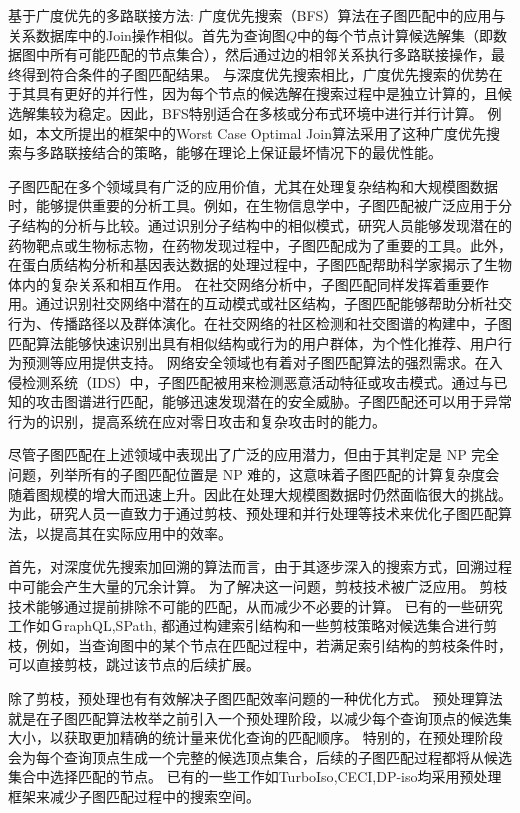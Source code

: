 基于广度优先的多路联接方法: 广度优先搜索（BFS）算法在子图匹配中的应用与关系数据库中的Join操作相似。首先为查询图$Q$中的每个节点计算候选解集（即数据图中所有可能匹配的节点集合），然后通过边的相邻关系执行多路联接操作，最终得到符合条件的子图匹配结果。
与深度优先搜索相比，广度优先搜索的优势在于其具有更好的并行性，因为每个节点的候选解在搜索过程中是独立计算的，且候选解集较为稳定。因此，BFS特别适合在多核或分布式环境中进行并行计算。
例如，本文所提出的框架中的Worst Case Optimal Join算法\cite{sm-bfs-DBLP:conf/focs/AtseriasGM08}采用了这种广度优先搜索与多路联接结合的策略，能够在理论上保证最坏情况下的最优性能。

子图匹配在多个领域具有广泛的应用价值，尤其在处理复杂结构和大规模图数据时，能够提供重要的分析工具。例如，在生物信息学中，子图匹配被广泛应用于分子结构的分析与比较。通过识别分子结构中的相似模式，研究人员能够发现潜在的药物靶点或生物标志物，在药物发现过程中，子图匹配成为了重要的工具。此外，在蛋白质结构分析和基因表达数据的处理过程中，子图匹配帮助科学家揭示了生物体内的复杂关系和相互作用。
在社交网络分析中，子图匹配同样发挥着重要作用。通过识别社交网络中潜在的互动模式或社区结构，子图匹配能够帮助分析社交行为、传播路径以及群体演化。在社交网络的社区检测和社交图谱的构建中，子图匹配算法能够快速识别出具有相似结构或行为的用户群体，为个性化推荐、用户行为预测等应用提供支持。
网络安全领域也有着对子图匹配算法的强烈需求。在入侵检测系统（IDS）中，子图匹配被用来检测恶意活动特征或攻击模式。通过与已知的攻击图谱进行匹配，能够迅速发现潜在的安全威胁。子图匹配还可以用于异常行为的识别，提高系统在应对零日攻击和复杂攻击时的能力。

尽管子图匹配在上述领域中表现出了广泛的应用潜力，但由于其判定是 NP 完全问题，列举所有的子图匹配位置是 NP 难的，这意味着子图匹配的计算复杂度会随着图规模的增大而迅速上升。因此在处理大规模图数据时仍然面临很大的挑战。
为此，研究人员一直致力于通过剪枝、预处理和并行处理等技术来优化子图匹配算法，以提高其在实际应用中的效率。

首先，对深度优先搜索加回溯的算法而言，由于其逐步深入的搜索方式，回溯过程中可能会产生大量的冗余计算。
为了解决这一问题，剪枝技术被广泛应用。
剪枝技术能够通过提前排除不可能的匹配，从而减少不必要的计算。
已有的一些研究工作如ＧraphQL\cite{sm-GraphQL-DBLP:series/ads/HeS10},SPath\cite{sm-spath-DBLP:journals/pvldb/ZhaoH10},
都通过构建索引结构和一些剪枝策略对候选集合进行剪枝，例如，当查询图中的某个节点在匹配过程中，若满足索引结构的剪枝条件时，可以直接剪枝，跳过该节点的后续扩展。

除了剪枝，预处理也有有效解决子图匹配效率问题的一种优化方式。 
预处理算法就是在子图匹配算法枚举之前引入一个预处理阶段，以减少每个查询顶点的候选集大小，以获取更加精确的统计量来优化查询的匹配顺序。
特别的，在预处理阶段会为每个查询顶点生成一个完整的候选顶点集合，后续的子图匹配过程都将从候选集合中选择匹配的节点。
已有的一些工作如TurboIso\cite{sm-turbo-iso-DBLP:conf/sigmod/HanLL13},CECI\cite{sm-ceci-DBLP:conf/sigmod/BhattaraiLH19},DP-iso\cite{sm-dp-iso-DBLP:conf/sigmod/HanKGPH19}均采用预处理框架来减少子图匹配过程中的搜索空间。


